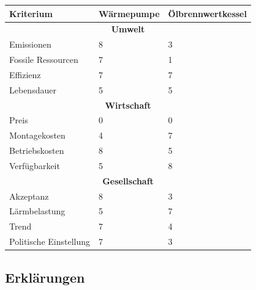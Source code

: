 \begin{center}
\begin{tabular}[c]{|p{}|p{}|p{}|}

  \hline
  \textbf{\Large{Kriterium}} &
  \textbf{\Large{Wärmepumpe}} &
  \textbf{\Large{Ölbrennwertkessel}} \\ \hline

  \multicolumn{3}{|c|}{\textbf{\Large{Umwelt}}} \\ \hline
  
  Emissionen
  & 8 & 3 \\
  Fossile Ressourcen
  & 7 & 1 \\
  Effizienz
  & 7 & 7 \\
  Lebensdauer
  & 5 & 5 \\ %
  \hline
  
  \multicolumn{3}{|c|}{\textbf{\Large{Wirtschaft}}} \\ \hline
  
  Preis
  & 0 & 0 \\ %
  Montagekosten
  & 4 & 7 \\
  Betriebskosten
  & 8 & 5 \\
  Verfügbarkeit
  & 5 & 8 \\
  \hline

  \multicolumn{3}{|c|}{\textbf{\Large{Gesellschaft}}} \\ \hline

  Akzeptanz
  & 8 & 3 \\
  Lärmbelastung
  & 5 & 7 \\
  Trend
  & 7 & 4 \\
  Politische Einstellung
  & 7 & 3 \\ %
  \hline

\end{tabular}
\end{center}

\subsection{Erklärungen}

